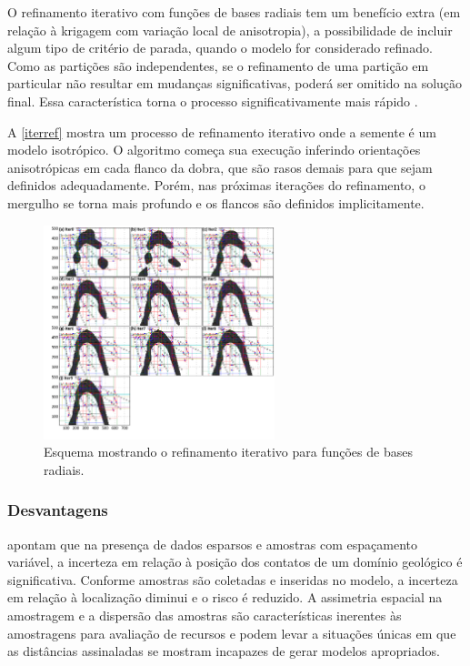O refinamento iterativo \cite{martin2017iterative} com funções de bases radiais tem um benefício extra (em relação à krigagem com variação local de anisotropia), a possibilidade de incluir algum tipo de critério de parada, quando o modelo for considerado refinado. Como as partições são independentes, se o refinamento de uma partição em particular não resultar em mudanças significativas, poderá ser omitido na solução final. Essa característica torna o processo significativamente mais rápido \cite{martin2017implicitmodeling}.

A \autoref{iterref} mostra um processo de refinamento iterativo onde a semente é um modelo isotrópico. O algoritmo começa sua execução inferindo orientações anisotrópicas em cada flanco da dobra, que são rasos demais para que sejam definidos adequadamente. Porém, nas próximas iterações do refinamento, o mergulho se torna mais profundo e os flancos são definidos implicitamente.

\begin{figure}[H]
\caption{\label{iterref} Esquema mostrando o refinamento iterativo para funções de bases radiais.}
	\centering
		\includegraphics[width=0.6\textwidth]{capitulo_2/imagens/iterref.jpg}
\end{figure}

\subsubsection{Desvantagens}\label{problemas}

 apontam que na presença de dados esparsos e amostras com espaçamento variável, a incerteza em relação à posição dos contatos de um domínio geológico é significativa. Conforme amostras são coletadas e inseridas no modelo, a incerteza em relação à localização diminui e o risco é reduzido. A assimetria espacial na amostragem e a dispersão das amostras são características inerentes às amostragens para avaliação de recursos e podem levar a situações únicas em que as distâncias assinaladas se mostram incapazes de gerar modelos apropriados. 

